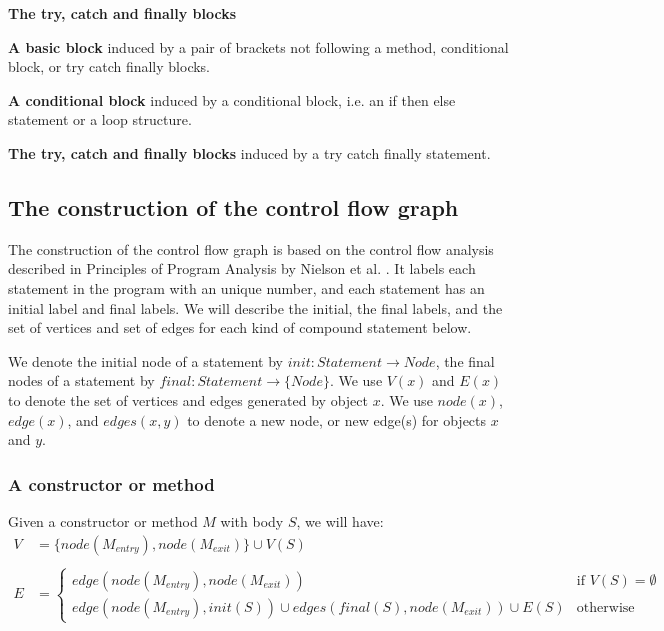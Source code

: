 \begin{labeling}{\textbf{The try, catch and finally blocks}}
    \item[\textbf{A basic block}] induced by a pair of brackets not following a method,
    conditional block, or try catch finally blocks.
    \item[\textbf{A conditional block}] induced by a conditional block, i.e. an if then 
    else statement or a loop structure.
    \item[\textbf{The try, catch and finally blocks}] induced by a try catch finally statement.
\end{labeling}

\subsection{The construction of the control flow graph}
The construction of the control flow graph is based on the control flow analysis
described in Principles of Program Analysis by Nielson et al. 
\cite{nielson2015principles}. It labels each statement in the program with an unique
number, and each statement has an initial label and final labels. We will describe 
the initial, the final labels, and the set of vertices and set of edges for each 
kind of compound statement below. 

We denote the initial node of a statement by $init : Statement \rightarrow Node$, the 
final nodes of a statement by $final : Statement \rightarrow \{Node\}$. 
We use $V(x)$ and $E(x)$ to denote the set of vertices and edges generated by object
$x$. We use $node(x)$, $edge(x)$, and $edges(x, y)$ to denote a new node, or new 
edge(s) for objects $x$ and $y$.

\subsubsection*{A constructor or method}
Given a constructor or method $M$ with body $S$, we will have:
\begin{align*}
    V &=\{node(M_{entry}), node(M_{exit})\} \cup V(S) \\ \\
    E &=
    \begin{cases}
      edge(node(M_{entry}), node(M_{exit})) 
        & \text{if } V(S) = \emptyset \\
      edge(node(M_{entry}), init(S)) \cup edges(final(S), node(M_{exit})) \cup E(S)
        & \text{otherwise}
    \end{cases}
\end{align*}

